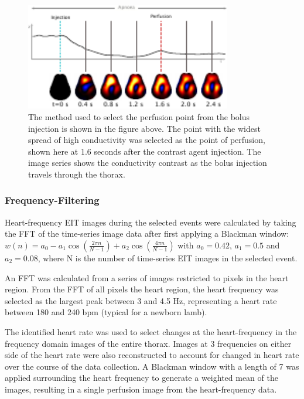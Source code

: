 \begin{figure}
\begin{flushright}
\includegraphics[width=0.8\textwidth]{chapter_2/imgs/fig-methodsBolus.pdf}
\end{flushright}
\caption[Selection of the bolus signal]{\label{fig:methodsBolus}%
The method used to select the perfusion point from the bolus injection is shown 
in the figure above. The point with the widest spread of high conductivity was 
selected as the point of perfusion, shown here at 1.6 seconds after the contrast 
agent injection. The image series shows the conductivity contrast as the bolus 
injection travels through the thorax.
}
\end{figure}


\subsubsection{Frequency-Filtering} \label{freqVent}

Heart-frequency EIT images during the selected events were calculated 
by taking the FFT of the time-series image data after first applying a Blackman window: 
$w(n)=a_{0}-a_{1}\cos \left({\frac {2\pi n}{N-1}}\right)+a_{2}\cos \left({\frac {4\pi n}{N-1}}\right)$ 
with $a_{0} = 0.42$, $a_{1} = 0.5$ and $a_{2} = 0.08$, where N is the number of time-series 
EIT images in the selected event.

An FFT was calculated from a series of images restricted to pixels in the heart 
region. From the FFT 
of all pixels the heart region, the heart frequency was selected as the largest 
peak between 3 and 4.5 Hz, representing a heart rate between 180 
and 240 bpm (typical for a newborn lamb).

The identified heart rate was used to select changes at the heart-frequency 
in the frequency domain images of the entire thorax. 
Images at 3 frequencies on either side of the heart rate were also reconstructed 
to account for changed in heart rate over the course of the data collection.
A Blackman window with a length of 7 was applied 
surrounding the heart frequency to generate a weighted mean of the images, resulting in 
a single perfusion image from the heart-frequency data. 
 
